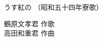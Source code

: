 \documentclass[10pt,b5j]{tarticle} %
\begin{document}
\begin{minipage}[c]{0.7\hsize} %
    \begin{center}
        {\LARGE
            うす紅の %
        }
        {\small 
            （昭和五十四年寮歌） %
        }
    \end{center}
\end{minipage}
\begin{minipage}[c]{0.3\hsize} %
    \begin{flushright} %
        鶴原文孝君 作歌\\高田和重君 作曲 %
    \end{flushright}
\end{minipage}
\end{document}
